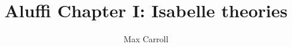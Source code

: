 \documentclass[11pt,a4paper]{article}
\begin{document}
\title{Aluffi Chapter I: Isabelle theories}
\author{Max Carroll}
\maketitle


\end{document}
